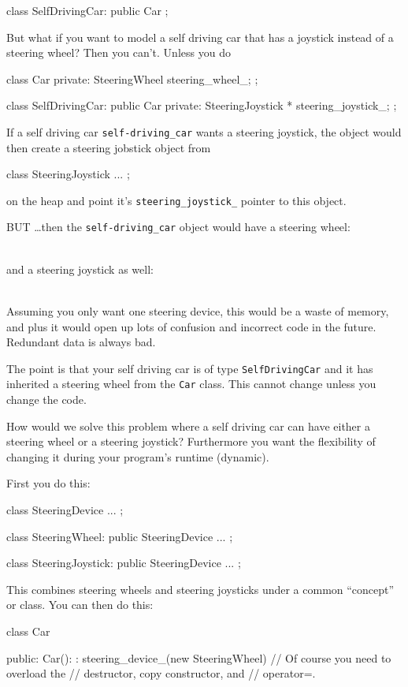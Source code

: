 \begin{console}
\begin{console}
class SelfDrivingCar: public Car
{
};
\end{console}
But what if you want to model a self driving car that has a joystick
instead of a steering wheel? Then you can't. Unless you do
\begin{console}
class Car
{
private:
     SteeringWheel steering_wheel_;
};

class SelfDrivingCar: public Car
{
private:
     SteeringJoystick * steering_joystick_;
};
\end{console}
If a self driving car \verb!self-driving_car! wants a steering joystick, the object would then create a steering jobstick object from
\begin{console}
class SteeringJoystick
{ ... };
\end{console}
on the heap and point it's \verb!steering_joystick_! pointer to this object.

BUT \ldots then the \verb!self-driving_car! object would have a steering wheel:

\\

and a steering joystick as well:

\\

Assuming you only want one steering device, this would be a waste of memory, and plus it would open up lots of confusion and incorrect code in the future. Redundant data is always bad.

The point is that your self driving car is of type \texttt{SelfDrivingCar} and it has inherited a steering wheel from the \texttt{Car} class. This cannot change unless you change the code.

How would we solve this problem where a self driving car can have either a steering wheel or a steering joystick? Furthermore you want the flexibility of changing it during your program's runtime (dynamic).

First you do this:
\begin{console}
class SteeringDevice
{ ... };

class SteeringWheel: public SteeringDevice
{ ... };

class SteeringJoystick: public SteeringDevice
{ ... };
\end{console}
This combines steering wheels and steering joysticks under a common
``concept'' or class. You can then do this:
\begin{console}
class Car
{
public:
     Car():
        : steering_device_(new SteeringWheel)
     {}
     // Of course you need to overload the
     // destructor, copy constructor, and
     // operator=.

}
\end{console}
\end{console}
